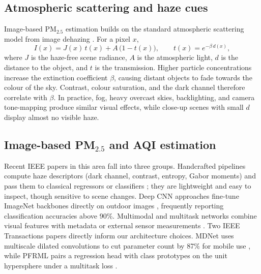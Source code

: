 \documentclass[conference]{IEEEtran}
\newcommand{\pmtwofive}{PM$_{2.5}$}
\begin{document}
\subsection{Atmospheric scattering and haze cues}
Image-based \pmtwofive{} estimation builds on the standard atmospheric
scattering model from image dehazing \cite{he2011darkchannel}. For a pixel $x$,
\begin{equation}
  I(x) = J(x)\,t(x) + A\,\bigl(1 - t(x)\bigr), \qquad t(x) = e^{-\beta\, d(x)},
  \label{eq:scatter}
\end{equation}
where $J$ is the haze-free scene radiance, $A$ is the atmospheric light, $d$ is
the distance to the object, and $t$ is the transmission. Higher particle
concentrations increase the extinction coefficient $\beta$, causing distant
objects to fade towards the colour of the sky. Contrast, colour saturation, and
the dark channel therefore correlate with $\beta$. In practice, fog, heavy
overcast skies, backlighting, and camera tone-mapping produce similar visual
effects, while close-up scenes with small $d$ display almost no visible haze.

\subsection{Image-based \pmtwofive{} and AQI estimation}
Recent IEEE papers in this area fall into three groups. Handcrafted pipelines
compute haze descriptors (dark channel, contrast, entropy, Gabor moments) and
pass them to classical regressors or classifiers
\cite{marzaguiReviewImageQuality2024,yadavRoadsideTreeImageBased2025,razimiIntegratingDeepLearning2024a};
they are lightweight and easy to inspect, though sensitive to scene changes.
Deep CNN approaches fine-tune ImageNet backbones directly on outdoor images
\cite{kumaar.bImageBasedAir2025,vermaImagebasedAirPollution2025,kaushalEvaluationDeepLearning2024,zhangAirQualityLevel2024,mohanDeepLearningBasedPM252025,chakrabortyCanImageTell2024},
frequently reporting classification accuracies above 90\%. Multimodal and
multitask networks combine visual features with metadata or external sensor
measurements
\cite{abdelsalamSkyFuseNetCrossAttentionSwin2026,dohaDeepMultiTaskLearning2026,hanSmartCamAirDetectContrastiveApproach2025,leeEnhancingPM25Detection2025}.
Two IEEE Transactions papers directly inform our architecture choices. MDNet
uses multiscale dilated convolutions to cut parameter count by 87\% for mobile
use \cite{wangLightweightAirQuality2024}, while PFRML pairs a regression head
with class prototypes on the unit hypersphere under a multitask loss
\cite{wangPrototypeFeatureRepresentationGuided2026}.
\end{document}
